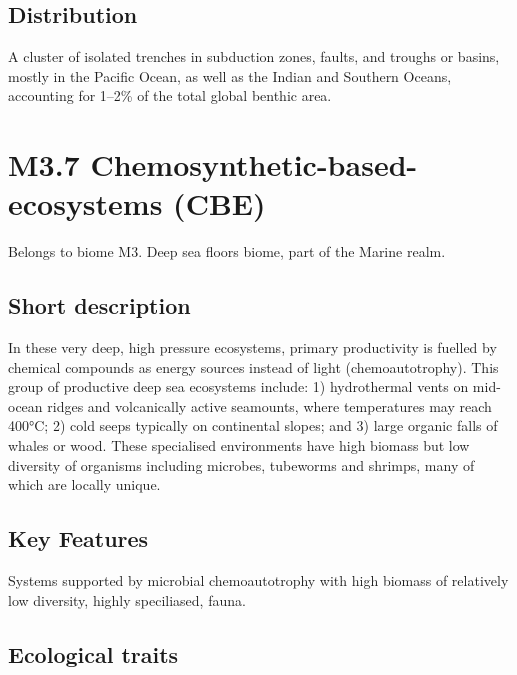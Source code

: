\documentclass[
  letterpaper,
  DIV=11,
  numbers=noendperiod]{scrartcl}
\begin{document}
\subsection{Distribution}\label{distribution-45}

A cluster of isolated trenches in subduction zones, faults, and troughs
or basins, mostly in the Pacific Ocean, as well as the Indian and
Southern Oceans, accounting for 1--2\% of the total global benthic area.

\section{M3.7 Chemosynthetic-based-ecosystems
(CBE)}\label{m3.7-chemosynthetic-based-ecosystems-cbe}

Belongs to biome M3. Deep sea floors biome, part of the Marine realm.

\subsection{Short description}\label{short-description-46}

In these very deep, high pressure ecosystems, primary productivity is
fuelled by chemical compounds as energy sources instead of light
(chemoautotrophy). This group of productive deep sea ecosystems include:
1) hydrothermal vents on mid-ocean ridges and volcanically active
seamounts, where temperatures may reach 400°C; 2) cold seeps typically
on continental slopes; and 3) large organic falls of whales or wood.
These specialised environments have high biomass but low diversity of
organisms including microbes, tubeworms and shrimps, many of which are
locally unique.

\subsection{Key Features}\label{key-features-46}

Systems supported by microbial chemoautotrophy with high biomass of
relatively low diversity, highly speciliased, fauna.

\subsection{Ecological traits}\label{ecological-traits-46}
\end{document}
